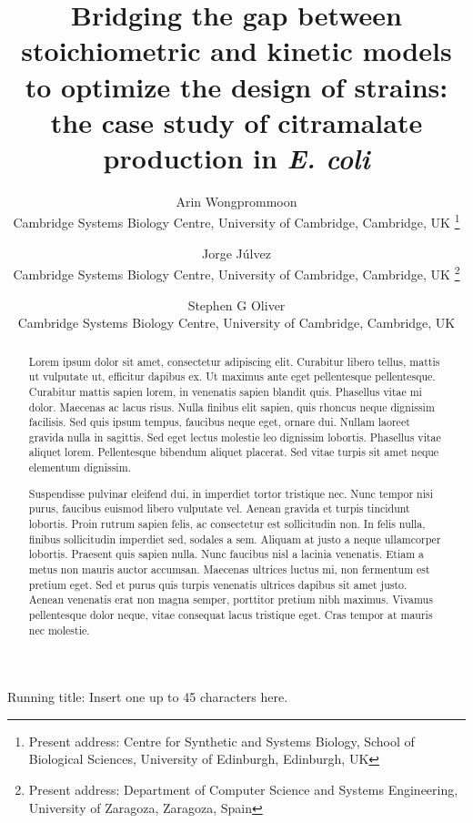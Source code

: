 \documentclass[a4paper, 12pt]{scrartcl}
\begin{document}
  \title{Bridging the gap between stoichiometric and kinetic models to optimize the design of strains: the case study of citramalate production in \emph{E. coli}}

  \author{
    Arin Wongprommoon\\
    {\small Cambridge Systems Biology Centre, University of Cambridge, Cambridge, UK \thanks{
      Present address: Centre for Synthetic and Systems Biology, School of Biological Sciences, University of Edinburgh, Edinburgh, UK} } \and
    Jorge J\'ulvez \\
    {\small Cambridge Systems Biology Centre, University of Cambridge, Cambridge, UK \thanks{
      Present address: Department of Computer Science and Systems Engineering, University of Zaragoza, Zaragoza, Spain} } \and
    Stephen G Oliver\\
    {\small Cambridge Systems Biology Centre, University of Cambridge, Cambridge, UK }}

  \maketitle

  Running title: Insert one up to 45 characters here.

  \pagebreak

  \doublespacing
  
  \begin{abstract}

Lorem ipsum dolor sit amet, consectetur adipiscing elit. Curabitur libero tellus, mattis ut vulputate ut, efficitur dapibus ex. Ut maximus ante eget pellentesque pellentesque. Curabitur mattis sapien lorem, in venenatis sapien blandit quis. Phasellus vitae mi dolor. Maecenas ac lacus risus. Nulla finibus elit sapien, quis rhoncus neque dignissim facilisis. Sed quis ipsum tempus, faucibus neque eget, ornare dui. Nullam laoreet gravida nulla in sagittis. Sed eget lectus molestie leo dignissim lobortis. Phasellus vitae aliquet lorem. Pellentesque bibendum aliquet placerat. Sed vitae turpis sit amet neque elementum dignissim.

Suspendisse pulvinar eleifend dui, in imperdiet tortor tristique nec. Nunc tempor nisi purus, faucibus euismod libero vulputate vel. Aenean gravida et turpis tincidunt lobortis. Proin rutrum sapien felis, ac consectetur est sollicitudin non. In felis nulla, finibus sollicitudin imperdiet sed, sodales a sem. Aliquam at justo a neque ullamcorper lobortis. Praesent quis sapien nulla. Nunc faucibus nisl a lacinia venenatis. Etiam a metus non mauris auctor accumsan. Maecenas ultrices luctus mi, non fermentum est pretium eget. Sed et purus quis turpis venenatis ultrices dapibus sit amet justo. Aenean venenatis erat non magna semper, porttitor pretium nibh maximus. Vivamus pellentesque dolor neque, vitae consequat lacus tristique eget. Cras tempor at mauris nec molestie. 

  \end{abstract}
\end{document}
